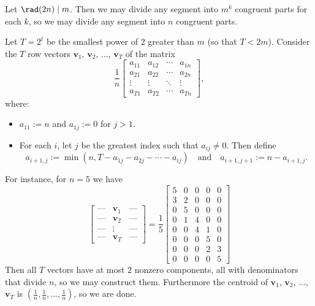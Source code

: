 Let $\rad(2n)\mid m$. Then we may divide any segment into $m^k$ congruent parts for each $k$, so we may divide any segment into $n$ congruent parts.

Let $T=2^t$ be the smallest power of $2$ greater than $m$ (so that $T<2m$). Consider the $T$ row vectors $\mathbf v_1$, $\mathbf v_2$, $\ldots$, $\mathbf v_T$ of the matrix
\[
    \frac1n\begin{bmatrix}
        a_{11}&a_{12}&\cdots&a_{1n}\\
        a_{21}&a_{22}&\cdots&a_{2n}\\
        \vdots&\vdots&\ddots&\vdots\\
        a_{T1}&a_{T2}&\cdots&a_{Tn}
    \end{bmatrix},
\]
where:
\begin{itemize}
    \item $a_{11}:=n$ and $a_{1j}:=0$ for $j>1$.
    \item For each $i$, let $j$ be the greatest index such that $a_{ij}\ne0$. Then define \[a_{i+1,j}:=\min(n,T-a_{1j}-a_{2j}-\cdots-a_{ij})\quad\text{and}\quad a_{i+1,j+1}:=n-a_{i+1,j}.\]
\end{itemize}

For instance, for $n=5$ we have
\[
    \begin{bmatrix}
        \textrm{---}&\mathbf v_1&\textrm{---}\\
        \textrm{---}&\mathbf v_2&\textrm{---}\\
        \textrm{---}&\vdots&\textrm{---}\\
        \textrm{---}&\mathbf v_T&\textrm{---}
    \end{bmatrix}
    =\frac15\begin{bmatrix}
        5&0&0&0&0\\
        3&2&0&0&0\\
        0&5&0&0&0\\
        0&1&4&0&0\\
        0&0&4&1&0\\
        0&0&0&5&0\\
        0&0&0&2&3\\
        0&0&0&0&5
    \end{bmatrix}
\]
Then all $T$ vectors have at most $2$ nonzero components, all with denominators that divide $n$, so we may construct them. Furthermore the centroid of $\mathbf v_1$, $\mathbf v_2$, $\ldots$, $\mathbf v_T$ is $(\tfrac1n,\tfrac1n,\ldots,\tfrac1n)$, so we are done.


